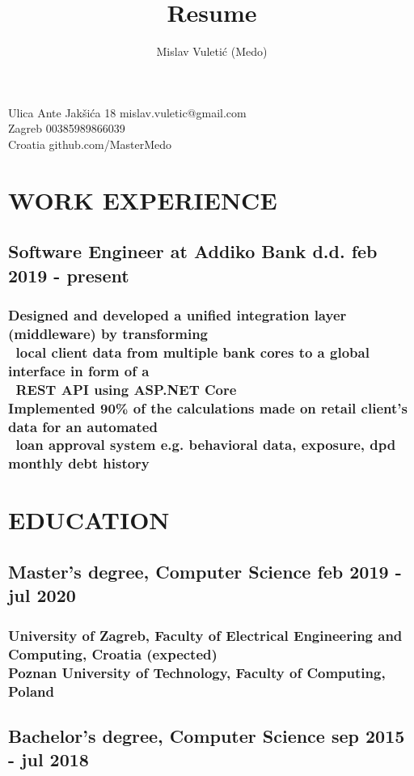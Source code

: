 \documentclass{article}
\begin{document}
\title{Resume}
\author{Mislav Vuletić (Medo)}

\begin{center}
\Huge\bfseries\theauthor\mdseries\large
\end{center}

\noindent Ulica Ante Jakšića 18 \hfill mislav.vuletic@gmail.com
\\ Zagreb \hfill 00385989866039
\\\noindent Croatia \hfill github.com/MasterMedo

\section{WORK EXPERIENCE} 
\subsection{Software Engineer at Addiko Bank d.d. \hfill feb 2019 - present}
\subsubsection{Designed and developed a unified integration layer (middleware) by transforming
	\\\-\ \quad local client data from multiple bank cores to a global interface in form of a
	\\\-\ \quad REST API using ASP.NET Core
	\\Implemented 90\% of the calculations made on retail client's data for an automated
	\\\-\ \quad loan approval system e.g. behavioral data, exposure, dpd monthly debt history}

\section{EDUCATION}
\subsection{Master's degree, Computer Science \hfill feb 2019 - jul 2020}
\subsubsection{University of Zagreb, Faculty of Electrical Engineering and Computing, Croatia \hfill (expected)
	\\Poznan University of Technology, Faculty of Computing, Poland}
\subsection{Bachelor's degree, Computer Science \hfill sep 2015 - jul 2018}
\end{document}
